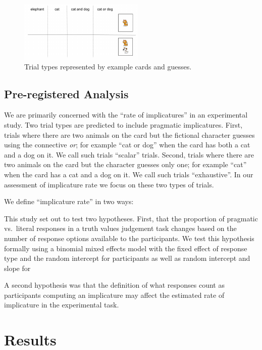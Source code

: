 \documentclass[floatsintext,man]{apa6}
\theoremstyle{definition}
\theoremstyle{definition}
\theoremstyle{definition}
\theoremstyle{remark}
\begin{document}
\begin{figure}[t]

{\centering \includegraphics{writeup_files/figure-latex/trials-1} 

}

\caption{Trial types represented by example cards and guesses.}\label{fig:trials}
\end{figure}

\subsection{Pre-registered Analysis}\label{pre-registered-analysis}

We are primarily concerned with the \enquote{rate of implicatures} in an
experimental study. Two trial types are predicted to include pragmatic
implicatures. First, trials where there are two animals on the card but
the fictional character guesses using the connective \emph{or}; for
example \enquote{cat or dog} when the card has both a cat and a dog on
it. We call such trials \enquote{scalar} trials. Second, trials where
there are two animals on the card but the character guesses only one;
for example \enquote{cat} when the card has a cat and a dog on it. We
call such trials \enquote{exhaustive}. In our assessment of implicature
rate we focus on these two types of trials.

We define \enquote{implicature rate} in two ways:

This study set out to test two hypotheses. First, that the proportion of
pragmatic vs.~literal responses in a truth values judgement task changes
based on the number of response options available to the participants.
We test this hypothesis formally using a binomial mixed effects model
with the fixed effect of response type and the random intercept for
participants as well as random intercept and slope for

A second hypothesis was that the definition of what responses count as
participants computing an implicature may affect the estimated rate of
implicature in the experimental task.

\section{Results}\label{results}
\end{document}
